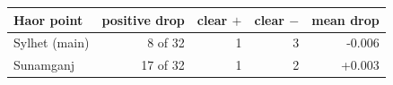 \begin{tabular}{@{}lrrrr@{}}
\toprule
Haor point & positive drop & clear $+$ & clear $-$ & mean drop \\
\midrule
Sylhet (main) & 8 of 32 & 1 & 3 & -0.006 \\
Sunamganj & 17 of 32 & 1 & 2 & +0.003 \\
\bottomrule
\end{tabular}
